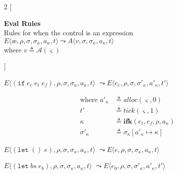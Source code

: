 \documentclass[12pt,draft]{article}
\newcommand\mae{\ensuremath{\text{\ae}}}
\newcommand{\ifsyn}[3]{(\texttt{if}\;#1\;#2\;#3)}
\begin{document}
\newpage
\footnotesize{
\begin{multicols*}{2}
[
\begin{center}
\textbf{Eval Rules} \\
Rules for when the control is an expression \\
\vspace{3mm}
$E\langle \mae , \rho , \sigma , \sigma_\kappa , a_\kappa , t \rangle
\leadsto
A\langle v , \sigma , \sigma_\kappa , a_\kappa , t \rangle$ \\
where $v \triangleq \mathcal{A}(\varsigma)$
\end{center}
]
\begin{center}
  $E\langle \ifsyn{e_c}{e_t}{e_f} , \rho , \sigma , \sigma_\kappa , a_\kappa , t \rangle$
  $\leadsto E\langle e_c , \rho , \sigma , \sigma'_\kappa , a'_\kappa , t' \rangle$
\end{center}
\vspace{-5mm}
\begin{align*}
  \text{where }
  a'_\kappa &\triangleq alloc(\varsigma, 0) \\
  t' &\triangleq tick(\varsigma, 1) \\
  \kappa &\triangleq \textbf{ifk}(e_t, e_f, \rho, a_\kappa) \\
  \sigma'_\kappa &\triangleq \sigma_\kappa[a'_\kappa \mapsto \kappa]
\end{align*}
\begin{center}
  $E\langle (\texttt{let}\;()\;e) , \rho , \sigma,\sigma_\kappa,a_\kappa , t \rangle$
  $\leadsto E\langle e , \rho , \sigma , \sigma_\kappa , a_\kappa , t \rangle$
\end{center}
\vspace{-3mm}
\begin{center}
  $E\langle (\texttt{let}\;bs\;e_b), \rho , \sigma , \sigma_\kappa , a_\kappa , t \rangle$
   $\leadsto E\langle e_0 , \rho , \sigma , \sigma'_\kappa , a'_\kappa , t' \rangle$
\end{center}

\end{multicols*}}
\end{document}
